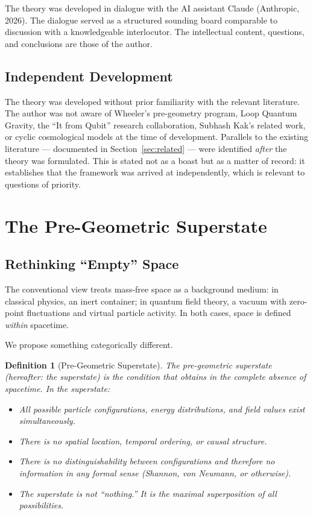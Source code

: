 \documentclass[12pt,a4paper]{article}
\newtheorem{definition}{Definition}
\begin{document}
\noindent
The theory was developed in dialogue with the AI assistant Claude
(Anthropic, 2026).  The dialogue served as a structured sounding board
comparable to discussion with a knowledgeable interlocutor.  The
intellectual content, questions, and conclusions are those of the author.

\subsection{Independent Development}

The theory was developed without prior familiarity with the relevant
literature.  The author was not aware of Wheeler's pre-geometry program,
Loop Quantum Gravity, the ``It from Qubit'' research collaboration,
Subhash Kak's related work, or cyclic cosmological models at the time
of development.  Parallels to the existing literature — documented in
Section~\ref{sec:related} — were identified \emph{after} the theory
was formulated.  This is stated not as a boast but as a matter of
record: it establishes that the framework was arrived at independently,
which is relevant to questions of priority.

\section{The Pre-Geometric Superstate}
\label{sec:superstate}

\subsection{Rethinking ``Empty'' Space}

The conventional view treats mass-free space as a background medium:
in classical physics, an inert container; in quantum field theory, a
vacuum with zero-point fluctuations and virtual particle activity.
In both cases, space is defined \emph{within} spacetime.

We propose something categorically different.

\begin{definition}[Pre-Geometric Superstate]
\label{def:superstate}
The \emph{pre-geometric superstate} (hereafter: the superstate) is the
condition that obtains in the complete absence of spacetime.  In the
superstate:
\begin{itemize}
  \item All possible particle configurations, energy distributions,
        and field values exist simultaneously.
  \item There is no spatial location, temporal ordering, or causal
        structure.
  \item There is no distinguishability between configurations and
        therefore no information in any formal sense (Shannon, von
        Neumann, or otherwise).
  \item The superstate is not ``nothing.''  It is the maximal
        superposition of all possibilities.
\end{itemize}
\end{definition}
\end{document}
